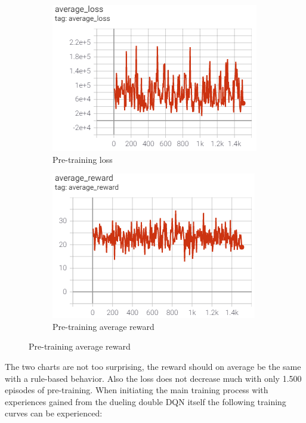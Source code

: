 \begin{figure}[ht]
	\centering
	\begin{subfigure}[b]{0.49\textwidth}
		\centering
		\includegraphics[width=\textwidth]{figures/training1-pre-loss.PNG}
		\caption{Pre-training loss}
		\label{fig:pre-loss-1}
	\end{subfigure}
	\hfill
	\begin{subfigure}[b]{0.49\textwidth}
		\centering
		\includegraphics[width=\textwidth]{figures/training1-pre-reward.PNG}
		\caption{Pre-training average reward}
		\label{fig:pre-reward-1}
	\end{subfigure}
\end{figure}

The two charts are not too surprising, the reward should on average be the same with a rule-based behavior. Also the loss does not decrease much with only 1.500 episodes of pre-training. When initiating the main training process with experiences gained from the dueling double DQN itself the following training curves can be experienced:

